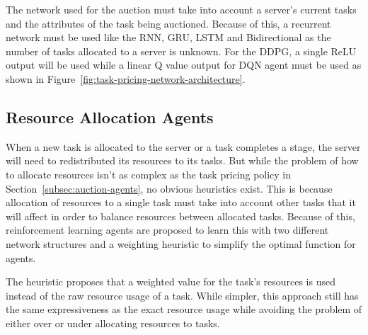 The network used for the auction must take into account a server's current tasks and the attributes of the task being
auctioned. Because of this, a recurrent network must be used like the RNN, GRU, LSTM and Bidirectional as the number
of tasks allocated to a server is unknown. For the DDPG, a single ReLU output will be used while a linear Q value output
for DQN agent must be used as shown in Figure~\ref{fig:task-pricing-network-architecture}.

\subsection{Resource Allocation Agents}
\label{subsec:resource-allocation-agents}
When a new task is allocated to the server or a task completes a stage, the server will need to redistributed its
resources to its tasks. But while the problem of how to allocate resources isn't as complex as the task pricing policy
in Section~\ref{subsec:auction-agents}, no obvious heuristics exist. This is because allocation of resources to a single
task must take into account other tasks that it will affect in order to balance resources between allocated tasks.
Because of this, reinforcement learning agents are proposed to learn this with two
different network structures and a weighting heuristic to simplify the optimal function for agents.

The heuristic proposes that a weighted value for the task's resources is used instead of the raw resource usage of a
task. While simpler, this approach still has the same expressiveness as the exact resource usage while avoiding
the problem of either over or under allocating resources to tasks.

